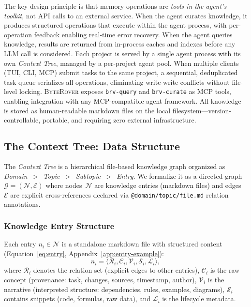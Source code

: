 \documentclass[11pt]{article}
\newcommand{\byterover}{\textsc{ByteRover}}
\newcommand{\contexttree}{\textit{Context Tree}}
\begin{document}
The key design principle is that memory operations are \emph{tools in the agent's toolkit},
not API calls to an external service.
When the agent curates knowledge, it produces structured operations that execute within
the agent process, with per-operation feedback enabling real-time error recovery.
When the agent queries knowledge, results are returned from in-process caches and indexes
before any LLM call is considered.
Each project is served by a single agent process with its own \contexttree{},
managed by a per-project agent pool.
When multiple clients (TUI, CLI, MCP) submit tasks to the same project,
a sequential, deduplicated task queue serializes all operations,
eliminating write-write conflicts without file-level locking.
\byterover{} exposes \texttt{brv-query} and \texttt{brv-curate} as MCP tools,
enabling integration with any MCP-compatible agent framework.
All knowledge is stored as human-readable markdown files on the local filesystem---version-controllable,
portable, and requiring zero external infrastructure.


\subsection{The Context Tree: Data Structure}
\label{sec:context-tree}

The \contexttree{} is a hierarchical file-based knowledge graph
organized as \textit{Domain~$>$~Topic~$>$~Subtopic~$>$~Entry}.
We formalize it as a directed graph $\mathcal{G} = (\mathcal{N}, \mathcal{E})$
where nodes~$\mathcal{N}$ are knowledge entries (markdown files)
and edges~$\mathcal{E}$ are explicit cross-references
declared via \texttt{@domain/topic/file.md} relation annotations.

\subsubsection{Knowledge Entry Structure}

Each entry $n_i \in \mathcal{N}$ is a standalone markdown file with structured content
(Equation~\ref{eq:entry}, Appendix~\ref{app:entry-example}):
\begin{equation}
  n_i = \langle \mathcal{R}_i, \mathcal{C}_i, \mathcal{V}_i, \mathcal{S}_i, \mathcal{L}_i \rangle,
  \label{eq:entry}
\end{equation}
where $\mathcal{R}_i$ denotes the relation set (explicit edges to other entries),
$\mathcal{C}_i$ is the raw concept (provenance: task, changes, sources, timestamp, author),
$\mathcal{V}_i$ is the narrative (interpreted structure: dependencies, rules, examples, diagrams),
$\mathcal{S}_i$ contains snippets (code, formulas, raw data),
and $\mathcal{L}_i$ is the lifecycle metadata.
\end{document}

